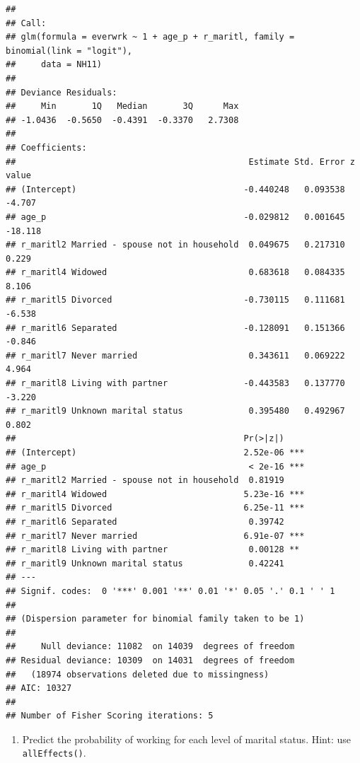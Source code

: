\documentclass[]{book}
\newenvironment{Shaded}{\begin{snugshade}}{\end{snugshade}}
\newcommand{\KeywordTok}[1]{\textcolor[rgb]{0.13,0.29,0.53}{\textbf{#1}}}
\newcommand{\NormalTok}[1]{#1}
\newcommand{\OperatorTok}[1]{\textcolor[rgb]{0.81,0.36,0.00}{\textbf{#1}}}
\newcommand{\StringTok}[1]{\textcolor[rgb]{0.31,0.60,0.02}{#1}}
\providecommand{\tightlist}{%
  \setlength{\itemsep}{0pt}\setlength{\parskip}{0pt}}
\begin{document}
\begin{verbatim}
## 
## Call:
## glm(formula = everwrk ~ 1 + age_p + r_maritl, family = binomial(link = "logit"), 
##     data = NH11)
## 
## Deviance Residuals: 
##     Min       1Q   Median       3Q      Max  
## -1.0436  -0.5650  -0.4391  -0.3370   2.7308  
## 
## Coefficients:
##                                              Estimate Std. Error z value
## (Intercept)                                 -0.440248   0.093538  -4.707
## age_p                                       -0.029812   0.001645 -18.118
## r_maritl2 Married - spouse not in household  0.049675   0.217310   0.229
## r_maritl4 Widowed                            0.683618   0.084335   8.106
## r_maritl5 Divorced                          -0.730115   0.111681  -6.538
## r_maritl6 Separated                         -0.128091   0.151366  -0.846
## r_maritl7 Never married                      0.343611   0.069222   4.964
## r_maritl8 Living with partner               -0.443583   0.137770  -3.220
## r_maritl9 Unknown marital status             0.395480   0.492967   0.802
##                                             Pr(>|z|)    
## (Intercept)                                 2.52e-06 ***
## age_p                                        < 2e-16 ***
## r_maritl2 Married - spouse not in household  0.81919    
## r_maritl4 Widowed                           5.23e-16 ***
## r_maritl5 Divorced                          6.25e-11 ***
## r_maritl6 Separated                          0.39742    
## r_maritl7 Never married                     6.91e-07 ***
## r_maritl8 Living with partner                0.00128 ** 
## r_maritl9 Unknown marital status             0.42241    
## ---
## Signif. codes:  0 '***' 0.001 '**' 0.01 '*' 0.05 '.' 0.1 ' ' 1
## 
## (Dispersion parameter for binomial family taken to be 1)
## 
##     Null deviance: 11082  on 14039  degrees of freedom
## Residual deviance: 10309  on 14031  degrees of freedom
##   (18974 observations deleted due to missingness)
## AIC: 10327
## 
## Number of Fisher Scoring iterations: 5
\end{verbatim}

\begin{enumerate}
\def\labelenumi{\arabic{enumi}.}
\setcounter{enumi}{1}
\tightlist
\item
  Predict the probability of working for each level of marital status. Hint: use \texttt{allEffects()}.
\end{enumerate}

\begin{Shaded}
\end{Shaded}
\end{document}

